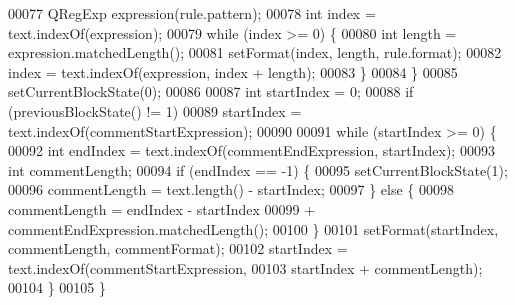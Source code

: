 \begin{DoxyCode}
00077          QRegExp expression(rule.pattern);
00078          \textcolor{keywordtype}{int} index = text.indexOf(expression);
00079          \textcolor{keywordflow}{while} (index >= 0) \{
00080              \textcolor{keywordtype}{int} length = expression.matchedLength();
00081              setFormat(index, length, rule.format);
00082              index = text.indexOf(expression, index + length);
00083          \}
00084      \}
00085      setCurrentBlockState(0);
00086 
00087      \textcolor{keywordtype}{int} startIndex = 0;
00088      \textcolor{keywordflow}{if} (previousBlockState() != 1)
00089          startIndex = text.indexOf(commentStartExpression);
00090 
00091      \textcolor{keywordflow}{while} (startIndex >= 0) \{
00092          \textcolor{keywordtype}{int} endIndex = text.indexOf(commentEndExpression, startIndex);
00093          \textcolor{keywordtype}{int} commentLength;
00094          \textcolor{keywordflow}{if} (endIndex == -1) \{
00095              setCurrentBlockState(1);
00096              commentLength = text.length() - startIndex;
00097          \} \textcolor{keywordflow}{else} \{
00098              commentLength = endIndex - startIndex
00099                              + commentEndExpression.matchedLength();
00100          \}
00101          setFormat(startIndex, commentLength, commentFormat);
00102          startIndex = text.indexOf(commentStartExpression,
00103                                                  startIndex + commentLength);
00104      \}
00105 \}
\end{DoxyCode}
